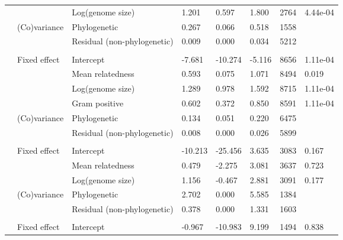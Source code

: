\begin{table}
\begin{tabular}[t]{llllllll}
\hspace{1em} &  & Log(genome size) & 1.201 & 0.597 & 1.800 & 2764 & 4.44e-04\\
\hspace{1em} & (Co)variance & Phylogenetic & 0.267 & 0.066 & 0.518 & 1558 & \\
\hspace{1em} &  & Residual (non-phylogenetic) & 0.009 & 0.000 & 0.034 & 5212 & \\
\addlinespace[0.3em]
\multicolumn{8}{l}{\textbf{Secretome}}\\
\hspace{1em} & Fixed effect & Intercept & -7.681 & -10.274 & -5.116 & 8656 & 1.11e-04\\
\hspace{1em} &  & Mean relatedness & 0.593 & 0.075 & 1.071 & 8494 & 0.019\\
\hspace{1em} &  & Log(genome size) & 1.289 & 0.978 & 1.592 & 8715 & 1.11e-04\\
\hspace{1em} &  & Gram positive & 0.602 & 0.372 & 0.850 & 8591 & 1.11e-04\\
\hspace{1em} & (Co)variance & Phylogenetic & 0.134 & 0.051 & 0.220 & 6475 & \\
\hspace{1em} &  & Residual (non-phylogenetic) & 0.008 & 0.000 & 0.026 & 5899 & \\
\addlinespace[0.3em]
\multicolumn{8}{l}{\textbf{Secretion systems}}\\
\hspace{1em} & Fixed effect & Intercept & -10.213 & -25.456 & 3.635 & 3083 & 0.167\\
\hspace{1em} &  & Mean relatedness & 0.479 & -2.275 & 3.081 & 3637 & 0.723\\
\hspace{1em} &  & Log(genome size) & 1.156 & -0.467 & 2.881 & 3091 & 0.177\\
\hspace{1em} & (Co)variance & Phylogenetic & 2.702 & 0.000 & 5.585 & 1384 & \\
\hspace{1em} &  & Residual (non-phylogenetic) & 0.378 & 0.000 & 1.331 & 1603 & \\
\addlinespace[0.3em]
\multicolumn{8}{l}{\textbf{Quorum sensing}}\\
\hspace{1em} & Fixed effect & Intercept & -0.967 & -10.983 & 9.199 & 1494 & 0.838\\

\end{tabular}
\end{table}
